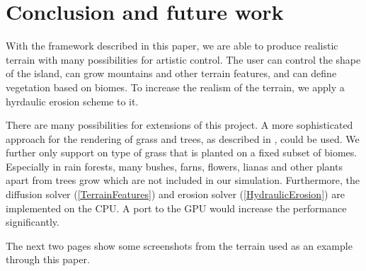 \documentclass[journal, letterpaper]{IEEEtran}
\begin{document}
\section{Conclusion and future work}
With the framework described in this paper, we are able to produce realistic terrain with many possibilities for artistic control.
The user can control the shape of the island, can grow mountains and other terrain features, and can define vegetation based on biomes. To increase the realism of the terrain, we apply a hyrdaulic erosion scheme to it.

There are many possibilities for extensions of this project. A more sophisticated approach for the rendering of grass and trees, as described in \cite{Boulanger.2005}, could be used. We further only support on type of grass that is planted on a fixed subset of biomes. Especially in rain forests, many bushes, farns, flowers, lianas and other plants apart from trees grow which are not included in our simulation. Furthermore, the diffusion solver (\ref{TerrainFeatures}) and erosion solver (\ref{HydraulicErosion}) are implemented on the CPU. A port to the GPU would increase the performance significantly.

The next two pages show some screenshots from the terrain used as an example through this paper.


%

\end{document}
